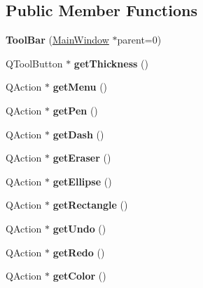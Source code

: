 \subsection*{Public Member Functions}
\begin{DoxyCompactItemize}
\item 
\hypertarget{classToolBar_ab8901509866946bda5b60f7d552bd528}{}{\bfseries Tool\+Bar} (\hyperlink{classMainWindow}{Main\+Window} $\ast$parent=0)\label{classToolBar_ab8901509866946bda5b60f7d552bd528}

\item 
\hypertarget{classToolBar_aafa0e24cdd217368cb02b3b3838ec888}{}Q\+Tool\+Button $\ast$ {\bfseries get\+Thickness} ()\label{classToolBar_aafa0e24cdd217368cb02b3b3838ec888}

\item 
\hypertarget{classToolBar_a207defd5ae8c4350c4abd2ca1d0e7dff}{}Q\+Action $\ast$ {\bfseries get\+Menu} ()\label{classToolBar_a207defd5ae8c4350c4abd2ca1d0e7dff}

\item 
\hypertarget{classToolBar_abb7c2ae67bd5845fe80c3eb9b4682cfb}{}Q\+Action $\ast$ {\bfseries get\+Pen} ()\label{classToolBar_abb7c2ae67bd5845fe80c3eb9b4682cfb}

\item 
\hypertarget{classToolBar_a303958854dfd8bb32633183ad463debe}{}Q\+Action $\ast$ {\bfseries get\+Dash} ()\label{classToolBar_a303958854dfd8bb32633183ad463debe}

\item 
\hypertarget{classToolBar_a0a485fea8f3417238191f477f98e638e}{}Q\+Action $\ast$ {\bfseries get\+Eraser} ()\label{classToolBar_a0a485fea8f3417238191f477f98e638e}

\item 
\hypertarget{classToolBar_acb3d121d28e1384f579ff1651cf7aced}{}Q\+Action $\ast$ {\bfseries get\+Ellipse} ()\label{classToolBar_acb3d121d28e1384f579ff1651cf7aced}

\item 
\hypertarget{classToolBar_a2e6ef5f8528a3cee382bbf8768208ade}{}Q\+Action $\ast$ {\bfseries get\+Rectangle} ()\label{classToolBar_a2e6ef5f8528a3cee382bbf8768208ade}

\item 
\hypertarget{classToolBar_ac193f12e841d2244b2d4fa1912fc4724}{}Q\+Action $\ast$ {\bfseries get\+Undo} ()\label{classToolBar_ac193f12e841d2244b2d4fa1912fc4724}

\item 
\hypertarget{classToolBar_a48426c626c6cfb08a4d24b9528496db7}{}Q\+Action $\ast$ {\bfseries get\+Redo} ()\label{classToolBar_a48426c626c6cfb08a4d24b9528496db7}

\item 
\hypertarget{classToolBar_ae4d2e201ec1dc073a710f4949a2a11e3}{}Q\+Action $\ast$ {\bfseries get\+Color} ()\label{classToolBar_ae4d2e201ec1dc073a710f4949a2a11e3}

\end{DoxyCompactItemize}


